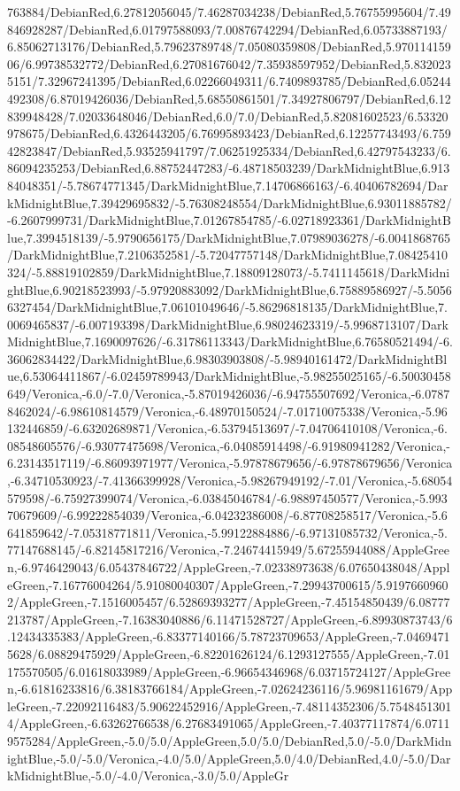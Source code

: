 {\begin{tikzternal}
763884/DebianRed,6.27812056045/7.46287034238/DebianRed,5.76755995604/7.49846928287/DebianRed,6.01797588093/7.00876742294/DebianRed,6.05733887193/6.85062713176/DebianRed,5.79623789748/7.05080359808/DebianRed,5.97011415906/6.99738532772/DebianRed,6.27081676042/7.35938597952/DebianRed,5.8320235151/7.32967241395/DebianRed,6.02266049311/6.7409893785/DebianRed,6.05244492308/6.87019426036/DebianRed,5.68550861501/7.34927806797/DebianRed,6.12839948428/7.02033648046/DebianRed,6.0/7.0/DebianRed,5.82081602523/6.53320978675/DebianRed,6.4326443205/6.76995893423/DebianRed,6.12257743493/6.75942823847/DebianRed,5.93525941797/7.06251925334/DebianRed,6.42797543233/6.86094235253/DebianRed,6.88752447283/-6.48718503239/DarkMidnightBlue,6.91384048351/-5.78674771345/DarkMidnightBlue,7.14706866163/-6.40406782694/DarkMidnightBlue,7.39429695832/-5.76308248554/DarkMidnightBlue,6.93011885782/-6.2607999731/DarkMidnightBlue,7.01267854785/-6.02718923361/DarkMidnightBlue,7.3994518139/-5.9790656175/DarkMidnightBlue,7.07989036278/-6.0041868765/DarkMidnightBlue,7.2106352581/-5.72047757148/DarkMidnightBlue,7.08425410324/-5.88819102859/DarkMidnightBlue,7.18809128073/-5.7411145618/DarkMidnightBlue,6.90218523993/-5.97920883092/DarkMidnightBlue,6.75889586927/-5.50566327454/DarkMidnightBlue,7.06101049646/-5.86296818135/DarkMidnightBlue,7.0069465837/-6.007193398/DarkMidnightBlue,6.98024623319/-5.9968713107/DarkMidnightBlue,7.1690097626/-6.31786113343/DarkMidnightBlue,6.76580521494/-6.36062834422/DarkMidnightBlue,6.98303903808/-5.98940161472/DarkMidnightBlue,6.53064411867/-6.02459789943/DarkMidnightBlue,-5.98255025165/-6.50030458649/Veronica,-6.0/-7.0/Veronica,-5.87019426036/-6.94755507692/Veronica,-6.07878462024/-6.98610814579/Veronica,-6.48970150524/-7.01710075338/Veronica,-5.96132446859/-6.63202689871/Veronica,-6.53794513697/-7.04706410108/Veronica,-6.08548605576/-6.93077475698/Veronica,-6.04085914498/-6.91980941282/Veronica,-6.23143517119/-6.86093971977/Veronica,-5.97878679656/-6.97878679656/Veronica,-6.34710530923/-7.41366399928/Veronica,-5.98267949192/-7.01/Veronica,-5.68054579598/-6.75927399074/Veronica,-6.03845046784/-6.98897450577/Veronica,-5.99370679609/-6.99222854039/Veronica,-6.04232386008/-6.87708258517/Veronica,-5.6641859642/-7.05318771811/Veronica,-5.99122884886/-6.97131085732/Veronica,-5.77147688145/-6.82145817216/Veronica,-7.24674415949/5.67255944088/AppleGreen,-6.9746429043/6.05437846722/AppleGreen,-7.02338973638/6.07650438048/AppleGreen,-7.16776004264/5.91080040307/AppleGreen,-7.29943700615/5.91976609602/AppleGreen,-7.1516005457/6.52869393277/AppleGreen,-7.45154850439/6.08777213787/AppleGreen,-7.16383040886/6.11471528727/AppleGreen,-6.89930873743/6.12434335383/AppleGreen,-6.83377140166/5.78723709653/AppleGreen,-7.04694715628/6.08829475929/AppleGreen,-6.82201626124/6.1293127555/AppleGreen,-7.01175570505/6.01618033989/AppleGreen,-6.96654346968/6.03715724127/AppleGreen,-6.61816233816/6.38183766184/AppleGreen,-7.02624236116/5.96981161679/AppleGreen,-7.22092116483/5.90622452916/AppleGreen,-7.48114352306/5.75484513014/AppleGreen,-6.63262766538/6.27683491065/AppleGreen,-7.40377117874/6.07119575284/AppleGreen,-5.0/5.0/AppleGreen,5.0/5.0/DebianRed,5.0/-5.0/DarkMidnightBlue,-5.0/-5.0/Veronica,-4.0/5.0/AppleGreen,5.0/4.0/DebianRed,4.0/-5.0/DarkMidnightBlue,-5.0/-4.0/Veronica,-3.0/5.0/AppleGr
\end{tikzternal}}
